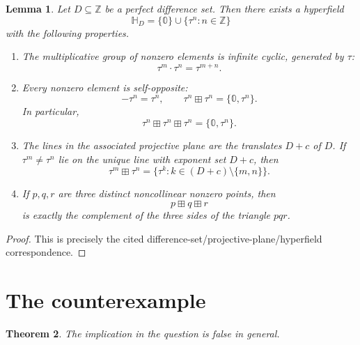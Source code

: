 \documentclass[11pt]{article}
\newtheorem{theorem}{Theorem}
\newtheorem{lemma}[theorem]{Lemma}
\newcommand{\hz}{\mathbb{0}}
\begin{document}
\begin{lemma}\label{lem:CC}
Let $D\subseteq \mathbb Z$ be a perfect difference set. Then there exists a hyperfield
\[
\mathbb H_D=\{\hz\}\cup\{\tau^n:n\in\mathbb Z\}
\]
with the following properties.

\begin{enumerate}
    \item The multiplicative group of nonzero elements is infinite cyclic, generated by $\tau$:
    \[
    \tau^m\cdot \tau^n=\tau^{m+n}.
    \]
    \item Every nonzero element is self-opposite:
    \[
    -\tau^n=\tau^n,\qquad
    \tau^n\boxplus\tau^n=\{\hz,\tau^n\}.
    \]
    In particular,
    \[
    \tau^n\boxplus\tau^n\boxplus\tau^n=\{\hz,\tau^n\}.
    \]
    \item The lines in the associated projective plane are the translates $D+c$ of $D$.
    If $\tau^m\neq \tau^n$ lie on the unique line with exponent set $D+c$, then
    \[
    \tau^m\boxplus \tau^n=\{\tau^k:k\in (D+c)\setminus\{m,n\}\}.
    \]
    \item If $p,q,r$ are three distinct noncollinear nonzero points, then
    \[
    p\boxplus q\boxplus r
    \]
    is exactly the complement of the three sides of the triangle $pqr$.
\end{enumerate}
\end{lemma}

\begin{proof}
This is precisely the cited difference-set/projective-plane/hyperfield correspondence.
\end{proof}

\section*{The counterexample}

\begin{theorem}
The implication in the question is false in general.
\end{theorem}
\end{document}
